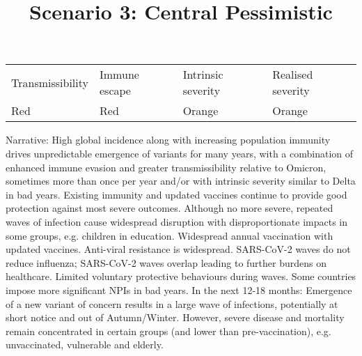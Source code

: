 \documentclass{article}
\begin{document}
\title{Scenario 3: Central Pessimistic}

\maketitle





\begin{tabu} to \textwidth { |X|X|X|X| }
\hline



Transmissibility   & Immune escape  & Intrinsic severity & Realised severity
 \\


Red & Red & Orange & Orange
 \\
\hline

\end{tabu}




Narrative: High global incidence along with increasing population immunity drives unpredictable emergence of variants for many years, with a combination of enhanced immune evasion and greater transmissibility relative to Omicron, sometimes more than once per year and/or with intrinsic severity similar to Delta in bad years. Existing immunity and updated vaccines continue to provide good protection against most severe outcomes. Although no more severe, repeated waves of infection cause widespread disruption with disproportionate impacts in some groups, e.g. children in education. Widespread annual vaccination with updated vaccines. Anti-viral resistance is widespread. SARS-CoV-2 waves do not reduce influenza; SARS-CoV-2 waves overlap leading to further burdens on healthcare. Limited voluntary protective behaviours during waves. Some countries impose more significant NPIs in bad years. In the next 12-18 months: Emergence of a new variant of concern results in a large wave of infections, potentially at short notice and out of Autumn/Winter. However, severe disease and mortality remain concentrated in certain groups (and lower than pre-vaccination), e.g. unvaccinated, vulnerable and elderly.
\end{document}
